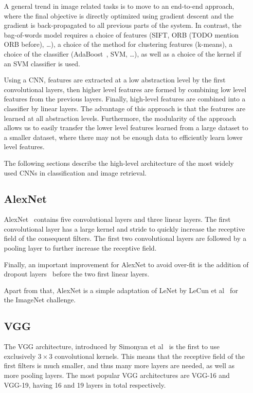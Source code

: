 A general trend in image related tasks is to move to an end-to-end
approach, where the final objective is directly optimized using gradient
descent and the gradient is back-propagated to all previous parts of the
system. In contrast, the bag-of-words model requires a choice of
features (SIFT, ORB (TODO mention ORB before), \dots),
a choice of the method for clustering features (k-means),
a choice of the classifier (AdaBoost~\cite{freund_desicion-theoretic_1995},
SVM, \dots), as well as a choice of the kernel if an SVM classifier is used.

Using a CNN, features are extracted at a low abstraction level by the
first convolutional layers, then higher level features are formed
by combining low level features from the previous layers. Finally,
high-level features are combined into a classifier by linear layers.
The advantage of this approach is that the features are learned at all
abstraction levels. Furthermore, the modularity of the approach allows
us to easily transfer the lower level features learned from a large dataset
to a smaller dataset, where there may not be enough data to efficiently
learn lower level features.

The following sections describe the high-level architecture of the
most widely used CNNs in classification and image retrieval.
\subsection{AlexNet}
AlexNet~\cite{krizhevsky_imagenet_2012} contains five convolutional
layers and three linear layers. The first convolutional layer
has a large kernel and stride to quickly increase the receptive field
of the consequent filters. The first two convolutional layers are followed
by a pooling layer to further increase the receptive field.

Finally, an important improvement for AlexNet to avoid over-fit is
the addition of dropout layers~\cite{hinton_improving_2012} before the
two first linear layers.

Apart from that, AlexNet is a simple adaptation of LeNet by
LeCun et al~\cite{lecun_gradient-based_1998} for the ImageNet challenge.

\subsection{VGG}
The VGG architecture, introduced by Simonyan et al~\cite{simonyan_very_2014}
is the first to use exclusively $3\times3$ convolutional kernels.
This means that the receptive field of the
first filters is much smaller, and thus many more layers are needed,
as well as more pooling layers. The most popular VGG architectures
are VGG-16 and VGG-19, having 16 and 19 layers in total respectively.

